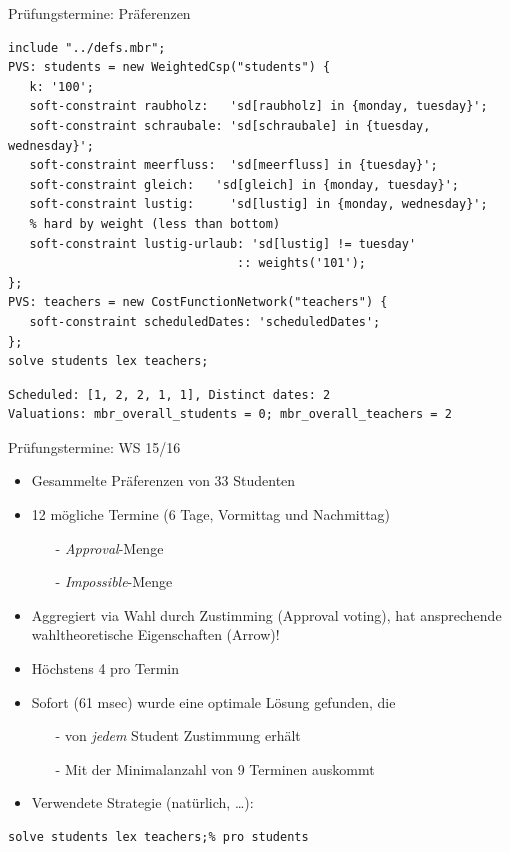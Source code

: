 \begin{frame}[fragile]{Prüfungstermine: Präferenzen}

\begin{lstlisting}
include "../defs.mbr";
PVS: students = new WeightedCsp("students") {
   k: '100';
   soft-constraint raubholz:   'sd[raubholz] in {monday, tuesday}';   
   soft-constraint schraubale: 'sd[schraubale] in {tuesday, wednesday}';
   soft-constraint meerfluss:  'sd[meerfluss] in {tuesday}';
   soft-constraint gleich:   'sd[gleich] in {monday, tuesday}';
   soft-constraint lustig:     'sd[lustig] in {monday, wednesday}';
   % hard by weight (less than bottom)
   soft-constraint lustig-urlaub: 'sd[lustig] != tuesday'
                                :: weights('101'); 
}; 
PVS: teachers = new CostFunctionNetwork("teachers") {
   soft-constraint scheduledDates: 'scheduledDates';
}; 
solve students lex teachers;
\end{lstlisting}
\begin{Verbatim}[fontsize=\small]
Scheduled: [1, 2, 2, 1, 1], Distinct dates: 2
Valuations: mbr_overall_students = 0; mbr_overall_teachers = 2
\end{Verbatim}
\end{frame}


\begin{frame}[fragile]{Prüfungstermine: WS 15/16}

\begin{itemize}
\item Gesammelte Präferenzen von 33 Studenten
\item 12 mögliche Termine (6 Tage, Vormittag und Nachmittag)
\begin{itemize}
\item[-] \emph{Approval}-Menge 
\item[-] \emph{Impossible}-Menge
\end{itemize}

\vspace*{2ex}

\item Aggregiert via Wahl durch Zustimming (\alert{Approval voting}), hat ansprechende wahltheoretische Eigenschaften (Arrow)!
\item Höchstens 4 pro Termin

\item Sofort (61 msec) wurde eine optimale Lösung gefunden, die
\begin{itemize}
\item[-] von \emph{jedem} Student Zustimmung erhält
\item[-] Mit der Minimalanzahl von 9 Terminen auskommt
\end{itemize}
\item Verwendete Strategie (natürlich, \ldots):
\end{itemize}
\begin{lstlisting}
solve students lex teachers;% pro students
\end{lstlisting}
\end{frame}

